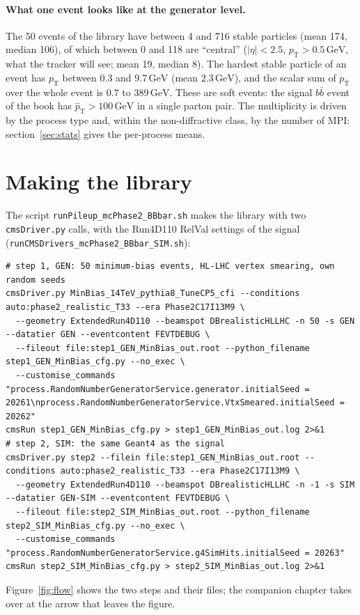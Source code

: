\documentclass[11pt,a4paper]{article}
\newcommand{\code}[1]{\texttt{#1}}
\newcommand{\pt}{\ensuremath{p_{\mathrm{T}}}}
\newcommand{\bbbar}{\ensuremath{b\bar{b}}}
\newcommand{\GeV}{\,\mathrm{GeV}}
\newcommand{\ptHat}{\ensuremath{\hat{p}_{\mathrm{T}}}}
\begin{document}
\paragraph{What one event looks like at the generator level.} The 50 events of the library have between 4
and 716 stable particles (mean 174, median 106), of which between 0 and 118 are ``central'' ($|\eta|<2.5$,
$\pt>0.5\GeV$, what the tracker will see; mean 19, median 8). The hardest stable particle of an event has
$\pt$ between $0.3$ and $9.7\GeV$ (mean $2.3\GeV$), and the scalar sum of $\pt$ over the whole event is
$0.7$ to $389\GeV$. These are soft events: the signal \bbbar{} event of the book has $\ptHat>100\GeV$ in a
single parton pair. The multiplicity is driven by the process type and, within the non-diffractive class,
by the number of MPI: section~\ref{sec:stats} gives the per-process means.

\section{Making the library}
\label{sec:making}

The script \code{runPileup\_mcPhase2\_BBbar.sh} makes the library with two \code{cmsDriver.py} calls, with
the Run4D110 RelVal settings of the signal (\code{runCMSDrivers\_mcPhase2\_BBbar\_SIM.sh}):
\begin{lstlisting}[style=sh]
# step 1, GEN: 50 minimum-bias events, HL-LHC vertex smearing, own random seeds
cmsDriver.py MinBias_14TeV_pythia8_TuneCP5_cfi --conditions auto:phase2_realistic_T33 --era Phase2C17I13M9 \
  --geometry ExtendedRun4D110 --beamspot DBrealisticHLLHC -n 50 -s GEN --datatier GEN --eventcontent FEVTDEBUG \
  --fileout file:step1_GEN_MinBias_out.root --python_filename step1_GEN_MinBias_cfg.py --no_exec \
  --customise_commands "process.RandomNumberGeneratorService.generator.initialSeed = 20261\nprocess.RandomNumberGeneratorService.VtxSmeared.initialSeed = 20262"
cmsRun step1_GEN_MinBias_cfg.py > step1_GEN_MinBias_out.log 2>&1
# step 2, SIM: the same Geant4 as the signal
cmsDriver.py step2 --filein file:step1_GEN_MinBias_out.root --conditions auto:phase2_realistic_T33 --era Phase2C17I13M9 \
  --geometry ExtendedRun4D110 --beamspot DBrealisticHLLHC -n -1 -s SIM --datatier GEN-SIM --eventcontent FEVTDEBUG \
  --fileout file:step2_SIM_MinBias_out.root --python_filename step2_SIM_MinBias_cfg.py --no_exec \
  --customise_commands "process.RandomNumberGeneratorService.g4SimHits.initialSeed = 20263"
cmsRun step2_SIM_MinBias_cfg.py > step2_SIM_MinBias_out.log 2>&1
\end{lstlisting}
Figure~\ref{fig:flow} shows the two steps and their files; the companion chapter takes over at the arrow
that leaves the figure.
\end{document}
